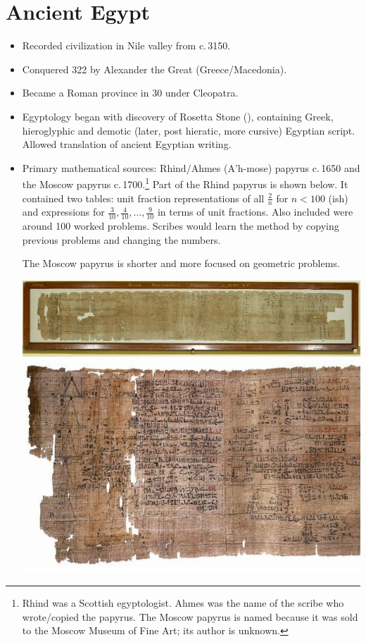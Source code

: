 \graphicspath{{1egypt/pics/}}

\section{Ancient Egypt}


\begin{itemize}\itemsep0pt
  \item Recorded civilization in Nile valley from c.\,3150\BC.
  \item Conquered 322\BC{} by Alexander the Great (Greece/Macedonia).
  \item Became a Roman province in 30\BC{} under Cleopatra. 
  \item Egyptology began with discovery of Rosetta Stone (), containing Greek, hieroglyphic and demotic (later, post hieratic, more cursive) Egyptian script. Allowed translation of ancient Egyptian writing.
  \item Primary mathematical sources: Rhind/Ahmes (A'h-mose) papyrus c.\,1650\BC{} and the Moscow papyrus c.\,1700\BC.\footnote{Rhind was a Scottish egyptologist. Ahmes was the name of the scribe who wrote/copied the papyrus. The Moscow papyrus is named because it was sold to the Moscow Museum of Fine Art; its author is unknown.} Part of the Rhind papyrus is shown below. It contained two tables: unit fraction representations of all $\frac 2n$ for $n<100$ (ish) and expressions for $\frac 3{10},\frac 4{10},\ldots,\frac 9{10}$ in terms of unit fractions. Also included were around 100 worked problems. Scribes would learn the method by copying previous problems and changing the numbers.\par
  The Moscow papyrus is shorter and more focused on geometric problems.
  \begin{center}
  \includegraphics[scale=0.4]{rhindwhole.jpg}\\
  \includegraphics[scale=0.8]{Rhind_Mathematical_Papyrus.jpg}

\end{center}
\end{itemize}
